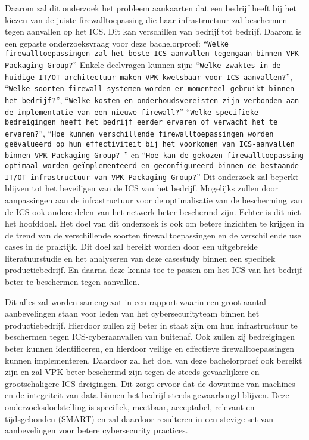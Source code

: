Daarom zal dit onderzoek het probleem aankaarten dat een bedrijf heeft bij het kiezen van de juiste firewalltoepassing die haar infrastructuur zal beschermen tegen aanvallen op het ICS. Dit kan verschillen van bedrijf tot bedrijf. Daarom is een gepaste onderzoeksvraag voor deze bachelorproef: ``\texttt{Welke firewalltoepassingen zal het beste ICS-aanvallen tegengaan binnen VPK Packaging Group?}'' Enkele deelvragen kunnen zijn: ``\texttt{Welke zwaktes in de huidige IT/OT architectuur maken VPK kwetsbaar voor ICS-aanvallen?}'', ``\texttt{Welke soorten firewall systemen worden er momenteel gebruikt binnen het bedrijf?}'', ``\texttt{Welke kosten en onderhoudsvereisten zijn verbonden aan de implementatie van een nieuwe firewall?}'' ``\texttt{Welke specifieke bedreigingen heeft het bedrijf eerder ervaren of verwacht het te ervaren?}'', ``\texttt{Hoe kunnen verschillende firewalltoepassingen worden geëvalueerd op hun effectiviteit bij het voorkomen van ICS-aanvallen binnen VPK Packaging Group?
}'' en  ``\texttt{Hoe kan de gekozen firewalltoepassing optimaal worden geïmplementeerd en geconfigureerd binnen de bestaande IT/OT-infrastructuur van VPK Packaging Group?}'' Dit onderzoek zal beperkt blijven tot het beveiligen van de ICS van het bedrijf. Mogelijks zullen door aanpassingen aan de infrastructuur voor de optimalisatie van de bescherming van de ICS ook andere delen van het netwerk beter beschermd zijn. Echter is dit niet het hoofddoel. Het doel van dit onderzoek is ook om betere inzichten te krijgen in de trend van de verschillende soorten firewalltoepassingen en de verschillende use cases in de praktijk. Dit doel zal bereikt worden door een uitgebreide literatuurstudie en het analyseren van deze casestudy binnen een specifiek productiebedrijf. En daarna deze kennis toe te passen om het ICS van het bedrijf beter te beschermen tegen aanvallen.

Dit alles zal worden samengevat in een rapport waarin een groot aantal aanbevelingen staan voor leden van het cybersecurityteam binnen het productiebedrijf. Hierdoor zullen zij beter in staat zijn om hun infrastructuur te beschermen tegen ICS-cyberaanvallen van buitenaf. Ook zullen zij bedreigingen beter kunnen identificeren, en hierdoor veilige en effectieve firewalltoepassingen kunnen implementeren. Daardoor zal het doel van deze bachelorproef ook bereikt zijn en zal VPK beter beschermd zijn tegen de steeds gevaarlijkere en grootschaligere ICS-dreigingen. Dit zorgt ervoor dat de downtime van machines en de integriteit van data binnen het bedrijf steeds gewaarborgd blijven. Deze onderzoeksdoelstelling is specifiek, meetbaar, acceptabel, relevant en tijdsgebonden (SMART) en zal daardoor resulteren in een stevige set van aanbevelingen voor betere cybersecurity practices.



